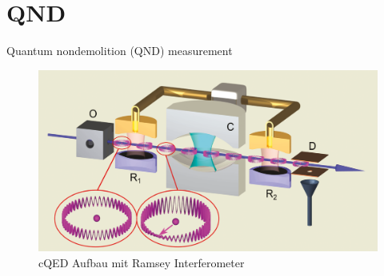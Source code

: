 \documentclass{beamer}
\begin{document}
\section{QND}
\begin{frame}{Quantum nondemolition (QND) measurement}
	\begin{figure}
		\center\includegraphics[width=1\textwidth]{images/aufbau.png}
		\caption{cQED Aufbau mit Ramsey Interferometer\cite{lect}}
	\end{figure}
\end{frame}
\end{document}
